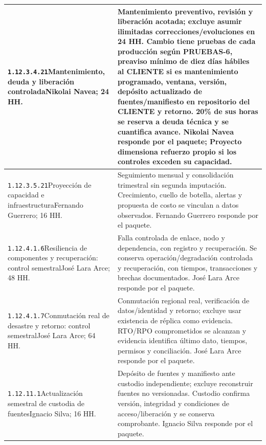 \begin{longtable}{L{52mm}L{91mm}}
\texttt{1.\allowbreak{}12.\allowbreak{}3.\allowbreak{}4.\allowbreak{}21}\newline Mantenimiento, deuda y liberación controlada\newline Nikolai Navea; 24 HH. & Mantenimiento preventivo, revisión y liberación acotada; excluye asumir ilimitadas correcciones/evoluciones en 24 HH. Cambio tiene pruebas de cada producción según PRUEBAS-6, preaviso mínimo de diez días hábiles al CLIENTE si es mantenimiento programado, ventana, versión, depósito actualizado de fuentes/manifiesto en repositorio del CLIENTE y retorno. 20\% de sus horas se reserva a deuda técnica y se cuantifica avance. Nikolai Navea responde por el paquete; Proyecto dimensiona refuerzo propio si los controles exceden su capacidad.\\\hline
\texttt{1.\allowbreak{}12.\allowbreak{}3.\allowbreak{}5.\allowbreak{}21}\newline Proyección de capacidad e infraestructura\newline Fernando Guerrero; 16 HH. & Seguimiento mensual y consolidación trimestral sin segunda imputación. Crecimiento, cuello de botella, alertas y propuesta de costo se vinculan a datos observados. Fernando Guerrero responde por el paquete.\\\hline
\texttt{1.\allowbreak{}12.\allowbreak{}4.\allowbreak{}1.\allowbreak{}6}\newline Resiliencia de componentes y recuperación: control semestral\newline José Lara Arce; 48 HH. & Falla controlada de enlace, nodo y dependencia, con registro y recuperación. Se conserva operación/degradación controlada y recuperación, con tiempos, transacciones y brechas documentados. José Lara Arce responde por el paquete.\\\hline
\texttt{1.\allowbreak{}12.\allowbreak{}4.\allowbreak{}1.\allowbreak{}7}\newline Conmutación real de desastre y retorno: control semestral\newline José Lara Arce; 64 HH. & Conmutación regional real, verificación de datos/identidad y retorno; excluye usar existencia de réplica como evidencia. RTO/RPO comprometidos se alcanzan y evidencia identifica último dato, tiempos, permisos y conciliación. José Lara Arce responde por el paquete.\\\hline
\texttt{1.\allowbreak{}12.\allowbreak{}11.\allowbreak{}1}\newline Actualización semestral de custodia de fuentes\newline Ignacio Silva; 16 HH. & Depósito de fuentes y manifiesto ante custodio independiente; excluye reconstruir fuentes no versionadas. Custodio confirma versión, integridad y condiciones de acceso/liberación y se conserva comprobante. Ignacio Silva responde por el paquete.\\\hline

\end{longtable}
